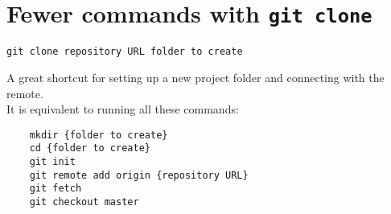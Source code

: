 \section{Fewer commands with \texttt{git clone}}

\texttt{git clone {repository URL} {folder to create}}

A great shortcut for setting up a new project folder and connecting with the remote.
\\
It is equivalent to running all these commands:

\begin{verbatim}
    mkdir {folder to create}
    cd {folder to create}
    git init
    git remote add origin {repository URL}
    git fetch
    git checkout master
\end{verbatim}